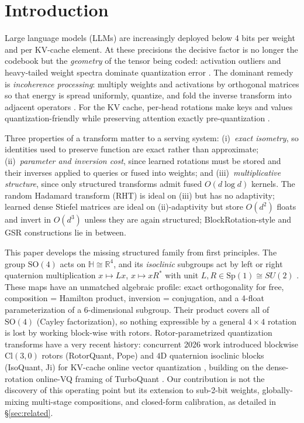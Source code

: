 \documentclass{article}
\newcommand{\R}{\mathbb{R}}
\newcommand{\SO}{\mathrm{SO}}
\newcommand{\Sp}{\mathrm{Sp}}
\begin{document}
\section{Introduction}
\label{sec:intro}

Large language models (LLMs) are increasingly deployed below 4 bits per weight
and per KV-cache element. At these precisions the decisive factor is no longer
the codebook but the \emph{geometry} of the tensor being coded: activation
outliers and heavy-tailed weight spectra dominate quantization error
\citep{dettmers2022llmint8,sun2024massive,frantar2023gptq}. The dominant remedy
is \emph{incoherence processing}: multiply weights and activations by orthogonal
matrices so that energy is spread uniformly, quantize, and fold the inverse
transform into adjacent operators \citep{chee2023quip,ashkboos2024quarot,liu2024spinquant,tseng2024quipsharp,tseng2024qtip,lin2024duquant}.
For the KV cache, per-head rotations make keys and values quantization-friendly
while preserving attention exactly pre-quantization
\citep{liu2024kivi,hooper2024kvquant,su2025rotatekv,lin2024qserve}.

Three properties of a transform matter to a serving system: (i)~\emph{exact
isometry}, so identities used to preserve function are exact rather than
approximate; (ii)~\emph{parameter and inversion cost}, since learned rotations
must be stored and their inverses applied to queries or fused into weights; and
(iii)~\emph{multiplicative structure}, since only structured transforms admit
fused $O(d\log d)$ kernels. The random Hadamard transform (RHT) is ideal on
(iii) but has no adaptivity; learned dense Stiefel matrices are ideal on
(ii)-adaptivity but store $O(d^2)$ floats and invert in $O(d^3)$ unless they are
again structured; BlockRotation-style and GSR constructions
\citep{choi2025gsr} lie in between.

This paper develops the missing structured family from first principles. The
group $\SO(4)$ acts on $\mathbb{H}\cong\R^4$, and its \emph{isoclinic}
subgroups act by left or right quaternion multiplication
$x\mapsto Lx$, $x\mapsto xR^{*}$ with unit $L,R\in\Sp(1)\cong SU(2)$
\citep{conway2003quaternions,thomas2015cayley}. These maps have an unmatched
algebraic profile: exact orthogonality for free, composition = Hamilton
product, inversion = conjugation, and a 4-float parameterization of a
6-dimensional subgroup. Their product covers all of $\SO(4)$ (Cayley
factorization), so nothing expressible by a general $4\times4$ rotation is lost
by working block-wise with rotors. Rotor-parametrized quantization transforms
have a very recent history: concurrent 2026 work introduced blockwise
$\mathrm{Cl}(3,0)$ rotors (RotorQuant, Pope) and $4$D quaternion isoclinic
blocks (IsoQuant, Ji) for KV-cache online vector quantization
\citep{pope2026rotorquant,ji2026isoquant}, building on the dense-rotation
online-VQ framing of TurboQuant \citep{google2025turboquant}. Our contribution
is not the discovery of this operating point but its extension to sub-2-bit
weights, globally-mixing multi-stage compositions, and closed-form calibration,
as detailed in \S\ref{sec:related}.
\end{document}
